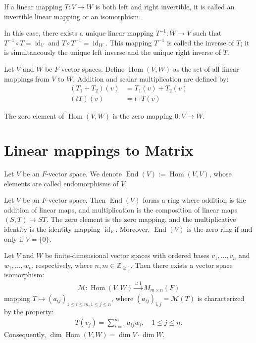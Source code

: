 \begin{definition}
  If a linear mapping $T: V \rightarrow W$ is both left and right invertible, it is called an invertible linear mapping or an isomorphism.

  In this case, there exists a unique linear mapping $T^{-1}: W \rightarrow V$ such that $T^{-1} \circ T = \operatorname{id}_V$ and $T \circ T^{-1} = \operatorname{id}_W$. This mapping $T^{-1}$ is called the inverse of $T$; it is simultaneously the unique left inverse and the unique right inverse of $T$.
\end{definition}

\begin{definition}
  Let $V$ and $W$ be $F$-vector spaces. Define $\operatorname{Hom}(V,W)$ as the set of all linear mappings from $V$ to $W$. Addition and scalar multiplication are defined by:
  \begin{align*}
    (T_1 + T_2)(v) &= T_1(v) + T_2(v)\\
    (tT)(v) &= t \cdot T(v)
  \end{align*}

  The zero element of $\operatorname{Hom}(V,W)$ is the zero mapping $0: V \rightarrow W$.
\end{definition}

\section{Linear mappings to Matrix}

\begin{definition}
Let $V$ be an $F$-vector space. We denote $\operatorname{End}(V) := \operatorname{Hom}(V,V)$, whose elements are called endomorphisms of $V$.
\end{definition}

\begin{corollary}
Let $V$ be an $F$-vector space. Then $\operatorname{End}(V)$ forms a ring where addition is the addition of linear maps, and multiplication is the composition of linear maps $(S,T) \mapsto ST$. The zero element is the zero mapping, and the multiplicative identity is the identity mapping $\operatorname{id}_V$. Moreover, $\operatorname{End}(V)$ is the zero ring if and only if $V = \{0\}$.
\end{corollary}

\begin{theorem}
Let $V$ and $W$ be finite-dimensional vector spaces with ordered bases $v_1,\ldots,v_n$ and $w_1,\ldots,w_m$ respectively, where $n,m \in \mathbb{Z}_{\geq 1}$. Then there exists a vector space isomorphism:
\begin{align*}
\mathcal{M}: \operatorname{Hom}(V,W) \stackrel{1:1}{\longrightarrow} M_{m\times n}(F)
\end{align*}
mapping $T \mapsto (a_{ij})_{1 \leq i \leq m, 1 \leq j \leq n}$, where $(a_{ij})_{i,j} = \mathcal{M}(T)$ is characterized by the property:
\begin{align*}
T(v_j) = \sum_{i=1}^m a_{ij}w_i, \quad 1 \leq j \leq n.
\end{align*}
Consequently, $\dim \operatorname{Hom}(V,W) = \dim V \cdot \dim W$.
\end{theorem}

